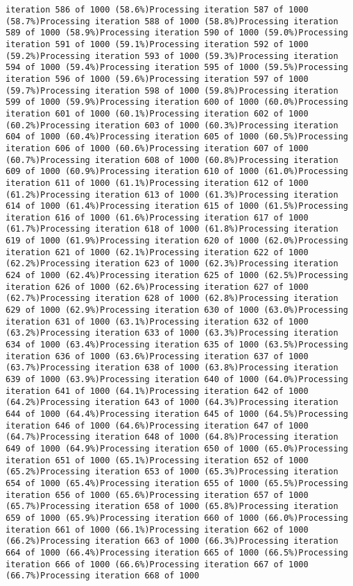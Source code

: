 \documentclass[
]{article}
\begin{document}
\begin{verbatim}
iteration 586 of 1000 (58.6%)Processing iteration 587 of 1000 (58.7%)Processing iteration 588 of 1000 (58.8%)Processing iteration 589 of 1000 (58.9%)Processing iteration 590 of 1000 (59.0%)Processing iteration 591 of 1000 (59.1%)Processing iteration 592 of 1000 (59.2%)Processing iteration 593 of 1000 (59.3%)Processing iteration 594 of 1000 (59.4%)Processing iteration 595 of 1000 (59.5%)Processing iteration 596 of 1000 (59.6%)Processing iteration 597 of 1000 (59.7%)Processing iteration 598 of 1000 (59.8%)Processing iteration 599 of 1000 (59.9%)Processing iteration 600 of 1000 (60.0%)Processing iteration 601 of 1000 (60.1%)Processing iteration 602 of 1000 (60.2%)Processing iteration 603 of 1000 (60.3%)Processing iteration 604 of 1000 (60.4%)Processing iteration 605 of 1000 (60.5%)Processing iteration 606 of 1000 (60.6%)Processing iteration 607 of 1000 (60.7%)Processing iteration 608 of 1000 (60.8%)Processing iteration 609 of 1000 (60.9%)Processing iteration 610 of 1000 (61.0%)Processing iteration 611 of 1000 (61.1%)Processing iteration 612 of 1000 (61.2%)Processing iteration 613 of 1000 (61.3%)Processing iteration 614 of 1000 (61.4%)Processing iteration 615 of 1000 (61.5%)Processing iteration 616 of 1000 (61.6%)Processing iteration 617 of 1000 (61.7%)Processing iteration 618 of 1000 (61.8%)Processing iteration 619 of 1000 (61.9%)Processing iteration 620 of 1000 (62.0%)Processing iteration 621 of 1000 (62.1%)Processing iteration 622 of 1000 (62.2%)Processing iteration 623 of 1000 (62.3%)Processing iteration 624 of 1000 (62.4%)Processing iteration 625 of 1000 (62.5%)Processing iteration 626 of 1000 (62.6%)Processing iteration 627 of 1000 (62.7%)Processing iteration 628 of 1000 (62.8%)Processing iteration 629 of 1000 (62.9%)Processing iteration 630 of 1000 (63.0%)Processing iteration 631 of 1000 (63.1%)Processing iteration 632 of 1000 (63.2%)Processing iteration 633 of 1000 (63.3%)Processing iteration 634 of 1000 (63.4%)Processing iteration 635 of 1000 (63.5%)Processing iteration 636 of 1000 (63.6%)Processing iteration 637 of 1000 (63.7%)Processing iteration 638 of 1000 (63.8%)Processing iteration 639 of 1000 (63.9%)Processing iteration 640 of 1000 (64.0%)Processing iteration 641 of 1000 (64.1%)Processing iteration 642 of 1000 (64.2%)Processing iteration 643 of 1000 (64.3%)Processing iteration 644 of 1000 (64.4%)Processing iteration 645 of 1000 (64.5%)Processing iteration 646 of 1000 (64.6%)Processing iteration 647 of 1000 (64.7%)Processing iteration 648 of 1000 (64.8%)Processing iteration 649 of 1000 (64.9%)Processing iteration 650 of 1000 (65.0%)Processing iteration 651 of 1000 (65.1%)Processing iteration 652 of 1000 (65.2%)Processing iteration 653 of 1000 (65.3%)Processing iteration 654 of 1000 (65.4%)Processing iteration 655 of 1000 (65.5%)Processing iteration 656 of 1000 (65.6%)Processing iteration 657 of 1000 (65.7%)Processing iteration 658 of 1000 (65.8%)Processing iteration 659 of 1000 (65.9%)Processing iteration 660 of 1000 (66.0%)Processing iteration 661 of 1000 (66.1%)Processing iteration 662 of 1000 (66.2%)Processing iteration 663 of 1000 (66.3%)Processing iteration 664 of 1000 (66.4%)Processing iteration 665 of 1000 (66.5%)Processing iteration 666 of 1000 (66.6%)Processing iteration 667 of 1000 (66.7%)Processing iteration 668 of 1000 
\end{verbatim}
\end{document}
